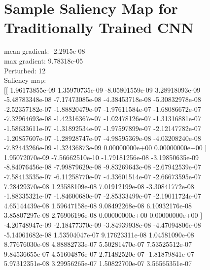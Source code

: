 \documentclass{article}
\begin{document}
\section{Sample Saliency Map for Traditionally Trained CNN}
mean gradient: -2.2915e-08\\
max gradient: 9.78318e-05\\
Perturbed: 12\\
Saliency map:\\
$[[$  1.96173855e-09   1.35970735e-09  -8.05801559e-09   3.28918093e-09 \\
   -5.48783348e-08  -7.17473085e-08  -4.38453718e-08  -5.30832978e-08 \\
   -2.52357182e-07  -1.88820479e-07  -1.97611584e-07  -1.68086672e-07 \\
   -7.32964693e-08  -1.42316367e-07  -1.02478126e-07  -1.31316881e-07 \\
   -1.58633611e-07  -1.31892534e-07  -1.97597899e-07  -2.12147782e-07 \\
   -1.20857607e-07  -1.28928747e-07  -4.98595369e-08  -4.03208240e-08 \\
   -7.82443266e-09  -1.32436873e-09   0.00000000e+00   0.00000000e+00 $]$ \\
    1.95072070e-09  -7.56662510e-10  -1.79181256e-08  -3.19850635e-09 \\
   -8.84076456e-08  -7.99879629e-08  -9.83269643e-08  -2.67942539e-07 \\
   -7.58413535e-07  -6.11258770e-07  -4.33601514e-07  -2.66673595e-07 \\
    7.28429370e-08   1.23588109e-08   7.01912199e-08  -3.30841772e-08 \\
   -1.88335321e-07  -1.84600680e-07  -2.85333499e-07  -2.19011724e-07 \\
    4.65144439e-08   1.59647158e-08   9.08492268e-08   6.10932176e-08 \\
	3.85807297e-08   2.76906196e-08   0.00000000e+00   0.00000000e+00 $]$ \\
   -4.20748947e-09  -2.18477370e-09  -3.84939938e-08  -4.47094806e-08 \\
   -5.14061682e-08   1.53504047e-07   9.17623311e-08   1.04581090e-08 \\
    8.77676030e-08   4.88882733e-07   5.50281470e-07   7.53525512e-07 \\
    9.84536655e-07   4.51604876e-07   2.71482520e-07  -1.81879841e-07 \\
    5.97312351e-08   3.29956265e-07   1.50822700e-07   3.56565351e-07 \\
\end{document}
